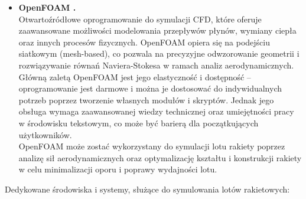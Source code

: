 \begin{itemize}
    \item \textbf{OpenFOAM \cite{openfoam2020}.}
    \\Otwartoźródłowe oprogramowanie do symulacji CFD, które oferuje zaawansowane możliwości modelowania przepływów płynów, wymiany ciepła oraz innych procesów fizycznych. OpenFOAM opiera się na podejściu siatkowym (mesh-based), co pozwala na precyzyjne odwzorowanie geometrii i rozwiązywanie równań Naviera-Stokesa w ramach analiz aerodynamicznych.
    Główną zaletą OpenFOAM jest jego elastyczność i dostępność –
    oprogramowanie jest darmowe i można je dostosować do indywidualnych
    potrzeb poprzez tworzenie własnych modułów i skryptów. Jednak jego
    obsługa wymaga zaawansowanej wiedzy technicznej oraz umiejętności pracy
    w środowisku tekstowym, co może być barierą dla początkujących
    użytkowników\cite{openfoam2023}. \\
    OpenFOAM może zostać wykorzystany do symulacji lotu rakiety poprzez analizę sił aerodynamicznych oraz optymalizację kształtu i konstrukcji rakiety w celu minimalizacji oporu i poprawy wydajności lotu.

\end{itemize}
Dedykowane środowiska i systemy, służące do symulowania lotów
rakietowych:

